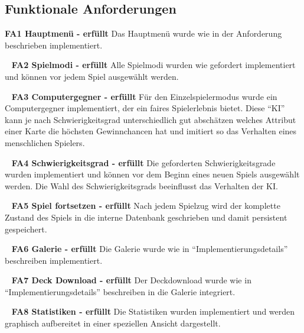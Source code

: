 \documentclass{scrartcl}
\begin{document}
\subsection{Funktionale Anforderungen}

\textbf{FA1 Hauptmenü - erfüllt} \newline
Das Hauptmenü wurde wie in der Anforderung beschrieben implementiert.

\ \newline
\textbf{FA2 Spielmodi - erfüllt} \newline
Alle Spielmodi wurden wie gefordert implementiert und können vor jedem Spiel
ausgewählt werden.

\ \newline
\textbf{FA3 Computergegner - erfüllt} \newline
Für den Einzelspielermodus wurde ein Computergegner implementiert, der ein
faires Spielerlebnis bietet. Diese \enquote{KI} kann je nach Schwierigkeitsgrad
unterschiedlich gut abschätzen welches Attribut einer Karte die höchsten
Gewinnchancen hat und imitiert so das Verhalten eines menschlichen Spielers.

\ \newline
\textbf{FA4 Schwierigkeitsgrad - erfüllt} \newline
Die geforderten Schwierigkeitsgrade wurden implementiert und können vor dem
Beginn eines neuen Spiels ausgewählt werden. Die Wahl des Schwierigkeitsgrads
beeinflusst das Verhalten der KI.

\ \newline
\textbf{FA5 Spiel fortsetzen - erfüllt} \newline
Nach jedem Spielzug wird der komplette Zustand des Spiels in die interne
Datenbank geschrieben und damit persistent gespeichert.

\ \newline
\textbf{FA6 Galerie - erfüllt} \newline
Die Galerie wurde wie in \enquote{Implementierungsdetails} beschreiben
implementiert.

\ \newline
\textbf{FA7 Deck Download - erfüllt} \newline
Der Deckdownload wurde wie in \enquote{Implementierungsdetails} beschreiben in
die Galerie integriert.

\ \newline
\textbf{FA8 Statistiken - erfüllt} \newline
Die Statistiken wurden implementiert und werden graphisch aufbereitet in einer
speziellen Ansicht dargestellt.
\end{document}
